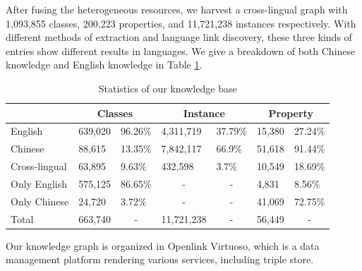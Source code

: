 \documentclass[runningheads,a4paper]{llncs}
\begin{document}
\begin{CJK*}{UTF8}{song}
After fusing the heterogeneous resources, we harvest a cross-lingual graph with 1,093,855 classes, 200,223 properties, and 11,721,238 instances respectively. With different methods of extraction and language link discovery, these three kinds of entries show different results in languages. We give a breakdown of both Chinese knowledge and English knowledge in Table \ref{tab:kb-result}.
\vspace{-0.5cm}
\begin{table}[ht]
\small
\centering
\caption{Statistics of our knowledge base}
\label{tab:kb-result}
\begin{tabular}{|l|l|l|l|l|l|l|}
\hline
\multicolumn{1}{|c|}{} & \multicolumn{2}{c|}{Classes}     & \multicolumn{2}{c|}{Instance}                   & \multicolumn{2}{c|}{Property}    \\ \hline
English                & 639,020 & 96.26\%                & 4,311,719              & 37.79\%                & 15,380  & 27.24\%                \\ \hline
Chinese                & 88,615  & 13.35\%                & 7,842,117              & 66.9\%                 & 51,618  & 91.44\%                \\ \hline
Cross-lingual          & 63,895  & 9.63\%                 & 432,598                & 3.7\%                  & 10,549  & 18.69\%                \\ \hline
Only English           & 575,125 & 86.65\%                & \multicolumn{1}{c|}{-} & \multicolumn{1}{c|}{-} & 4,831   & 8.56\%                 \\ \hline
Only Chinese           & 24,720  & 3.72\%                 & \multicolumn{1}{c|}{-} & \multicolumn{1}{c|}{-} & 41,069  & 72.75\%                \\ \hline
Total                  & 663,740 & \multicolumn{1}{c|}{-} & 11,721,238             & \multicolumn{1}{c|}{-} & 56,449  & \multicolumn{1}{c|}{-} \\ \hline
\end{tabular}
\end{table}
\vspace{-0.5cm}

Our knowledge graph is organized in Openlink Virtuoso, which is a data management platform rendering various services, including triple store.


\end{CJK*}
\end{document}
